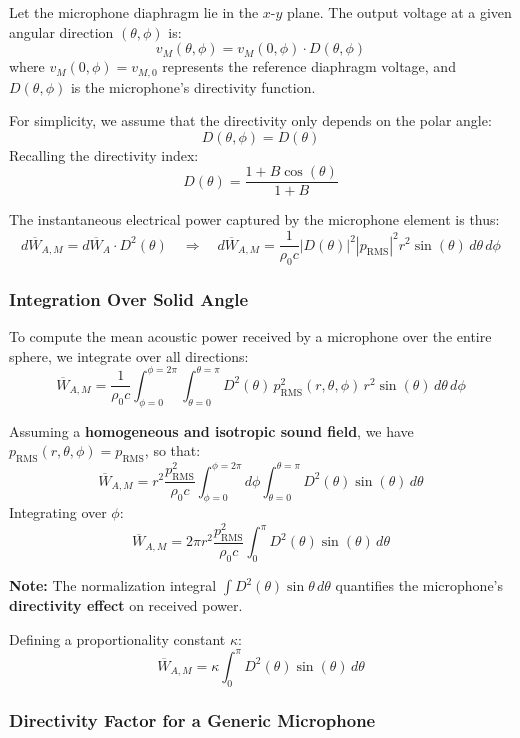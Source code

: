 Let the microphone diaphragm lie in the \( x\text{-}y \) plane.  
The output voltage at a given angular direction \( (\theta, \phi) \) is:
\[
v_M(\theta, \phi) = v_M(0, \phi) \cdot D(\theta, \phi)
\]
where \( v_M(0, \phi) = v_{M,0} \) represents the reference diaphragm voltage, and \( D(\theta, \phi) \) is the microphone’s directivity function.

For simplicity, we assume that the directivity only depends on the polar angle:
\[
D(\theta, \phi) = D(\theta)
\]
Recalling the directivity index:
\[
D(\theta) = \frac{1 + B \cos(\theta)}{1 + B}
\]

The instantaneous electrical power captured by the microphone element is thus:
\[
d\overline{W}_{A,M} = d\overline{W}_A \cdot D^2(\theta)
\quad \Rightarrow \quad 
d\overline{W}_{A,M} = \frac{1}{\rho_0 c} |D(\theta)|^2 |p_{\text{RMS}}|^2 r^2 \sin(\theta)\, d\theta\, d\phi
\]

\subsubsection{Integration Over Solid Angle}

To compute the mean acoustic power received by a microphone over the entire sphere, we integrate over all directions:
\[
\overline{W}_{A,M} = \frac{1}{\rho_0 c} \int_{\phi=0}^{\phi=2\pi} \int_{\theta=0}^{\theta=\pi} D^2(\theta) \, p_{\text{RMS}}^2(r, \theta, \phi) \, r^2 \sin(\theta)\, d\theta\, d\phi
\]

Assuming a \textbf{homogeneous and isotropic sound field}, we have \( p_{\text{RMS}}(r, \theta, \phi) = p_{\text{RMS}} \), so that:
\[
\overline{W}_{A,M} = r^2 \frac{p_{\text{RMS}}^2}{\rho_0 c} \int_{\phi=0}^{\phi=2\pi} d\phi\int_{\theta=0}^{\theta=\pi} D^2(\theta) \sin(\theta)\, d\theta
\]
Integrating over \( \phi \):
\[
\overline{W}_{A,M} = 2\pi r^2 \frac{p_{\text{RMS}}^2}{\rho_0 c} \int_{0}^{\pi} D^2(\theta) \sin(\theta)\, d\theta
\]

\noindent
\textbf{Note:}  
The normalization integral \( \int D^2(\theta)\sin\theta\, d\theta \) quantifies the microphone’s \textbf{directivity effect} on received power.

Defining a proportionality constant \( \kappa \):
\[
\overline{W}_{A,M} = \kappa \int_{0}^{\pi} D^2(\theta) \sin(\theta)\, d\theta
\]

\subsubsection{Directivity Factor for a Generic Microphone}


